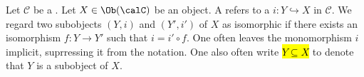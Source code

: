 \begin{definition} \label{definition:subobject_of_an_object_of_a_category}
Let $\mathcal{C}$ be a . Let $X \in \Ob(\calC)$ be an object. 
A  refers to a  $i: Y \hookrightarrow X$ in $\mathcal{C}$. We regard two subobjects $(Y,i)$ and $(Y',i')$ of $X$ as isomorphic if there exists an isomorphism $f: Y \to Y'$ such that $i = i' \circ f$. One often leaves the monomorphism $i$ implicit, suprressing it from the notation. One also often write \hl{$Y \subseteq X$} to denote that $Y$ is a subobject of $X$.
\end{definition}